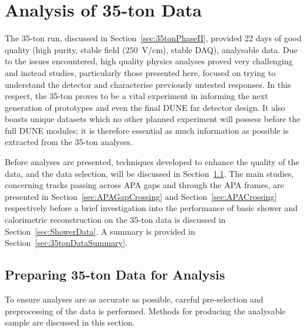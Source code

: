 
\graphicspath{{35tonAnalysis/Figs/}}

\chapter{Analysis of 35-ton Data}\label{chap:35tonAnalysis}

The 35-ton run, discussed in Section~\ref{sec:35tonPhaseII}, provided 22 days of good quality (high purity, stable field ($250$~V/cm), stable DAQ), analysable data.  Due to the issues encountered, high quality physics analyses proved very challenging and instead studies, particularly those presented here, focused on trying to understand the detector and characterise previously untested responses.  In this respect, the 35-ton proves to be a vital experiment in informing the next generation of prototypes and even the final DUNE far detector design.  It also boasts unique datasets which no other planned experiment will possess before the full DUNE modules; it is therefore essential as much information as possible is extracted from the 35-ton analyses.

Before analyses are presented, techniques developed to enhance the quality of the data, and the data selection, will be discussed in Section~\ref{sec:Preparing35tonData}.  The main studies, concerning tracks passing across APA gaps and through the APA frames, are presented in Section~\ref{sec:APAGapCrossing} and Section~\ref{sec:APACrossing} respectively before a brief investigation into the performance of basic shower and calorimetric reconstruction on the 35-ton data is discussed in Section~\ref{sec:ShowerData}.  A summary is provided in Section~\ref{sec:35tonDataSummary}.

\section{Preparing 35-ton Data for Analysis}\label{sec:Preparing35tonData}

To ensure analyses are as accurate as possible, careful pre-selection and preprocessing of the data is performed.  Methods for producing the analysable sample are discussed in this section.

